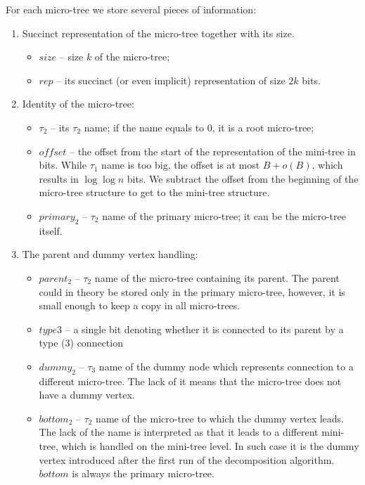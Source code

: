 For each micro-tree we store several pieces of information:
\begin{enumerate}
	\item Succinct representation of the micro-tree together with its size.
	\begin{itemize}
		\item $size$ -- size $k$ of the micro-tree;
		\item $rep$ -- its succinct (or even implicit) representation of size $2k$ bits.
	\end{itemize}
	
	\item Identity of the micro-tree:
	\begin{itemize}
		\item $\tau_2$ -- its $\tau_2$ name; if the name equals to $0$, it is a root micro-tree;
		\item $offset$ -- the offset from the start of the representation of the mini-tree in bits.
		While $\tau_1$ name is too big, the offset is at most $B + o(B)$, which results in $\log \log n$ bits.
		We subtract the offset from the beginning of the micro-tree structure to get to the mini-tree structure.
		\item $primary_2$ -- $\tau_2$ name of the primary micro-tree; it can be the micro-tree itself.
	\end{itemize}

	\item The parent and dummy vertex handling:
	\begin{itemize}
		\item $parent_2$ -- $\tau_2$ name of the micro-tree containing its parent.
		The parent could in theory be stored only in the primary micro-tree, however, it is small enough to keep a copy in all micro-trees.
		\item $type3$ -- a single bit denoting whether it is connected to its parent by a type (3) connection
		\item $dummy_2$ -- $\tau_3$ name of the dummy node which represents connection to a different micro-tree.
		The lack of it means that the micro-tree does not have a dummy vertex.
		\item $bottom_2$ -- $\tau_2$ name of the micro-tree to which the dummy vertex leads.
		The lack of the name is interpreted as that it leads to a different mini-tree, which is handled on the mini-tree level.
		In such case it is the dummy vertex introduced after the first run of the decomposition algorithm.
		$bottom$ is always the primary micro-tree.
	\end{itemize}
	

\end{enumerate}
